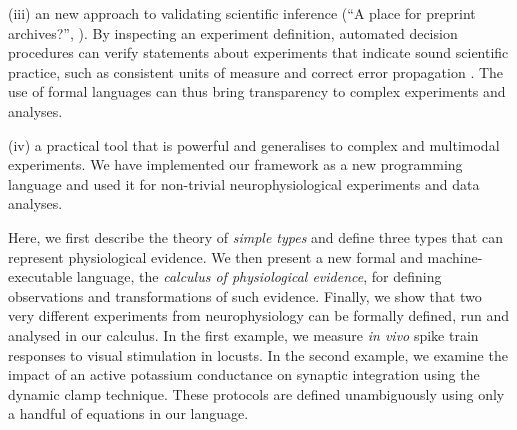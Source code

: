 (iii) an new approach to validating scientific inference (``A place
for preprint archives?'', \citeyear{Editors2003}). By inspecting an
experiment definition, automated decision procedures can verify
statements about experiments that indicate sound scientific practice,
such as consistent units of measure \citep{Kennedy1997} and correct
error propagation \citep{Taylor1997}. The use of formal languages can
thus bring transparency to complex experiments and analyses.

(iv) a practical tool that is powerful and generalises to complex and
multimodal experiments. We have implemented our framework as a new
programming language and used it for non-trivial neurophysiological
experiments and data analyses.

Here, we first describe the theory of \emph{simple types}
\citep{Pierce2002} and define three types that can represent
physiological evidence. We then present a new formal and
machine-executable language, the \emph{calculus of physiological
  evidence}, for defining observations and transformations of such
evidence. Finally, we show that two very different experiments from
neurophysiology can be formally defined, run and analysed in our
calculus. In the first example, we measure \emph{in vivo} spike train
responses to visual stimulation in locusts. In the second example, we
examine the impact of an active potassium conductance on synaptic
integration using the dynamic clamp technique. These protocols are
defined unambiguously using only a handful of equations in our
language.
